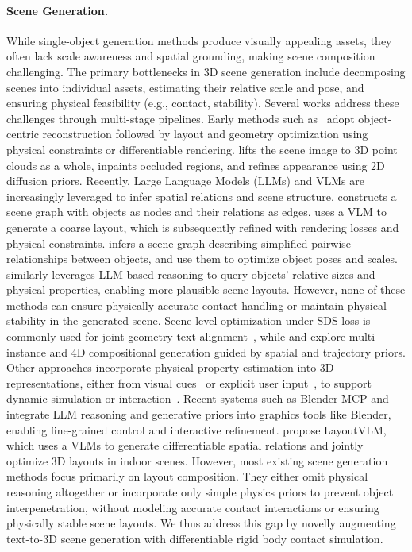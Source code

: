 \paragraph{Scene Generation.} 
While single-object generation methods produce visually appealing assets, they often lack scale awareness and spatial grounding, making scene composition challenging.
The primary bottlenecks in 3D scene generation include decomposing scenes into individual assets, estimating their relative scale and pose, and ensuring physical feasibility (e.g., contact, stability).
Several works address these challenges through multi-stage pipelines.
Early methods such as~\cite{vilesov2023cg3d,chen2024comboverse,han2024reparo} adopt object-centric reconstruction followed by layout and geometry optimization using physical constraints or differentiable rendering.
\citet{shriram2024realmdreamer} lifts the scene image to 3D point clouds as a whole, inpaints occluded regions, and refines appearance using 2D diffusion priors.
Recently, Large Language Models (LLMs) and VLMs are increasingly leveraged to infer spatial relations and scene structure.
\citet{gao2024graphdreamer} constructs a scene graph with objects as nodes and their relations as edges.
\citet{zhou2024gala3d} uses a VLM to generate a coarse layout, which is subsequently refined with rendering losses and physical constraints.
\citet{yao2025cast} infers a scene graph describing simplified pairwise relationships between objects, and use them to optimize object poses and scales.
\citet{wang2025embodiedgengenerative3dworld} similarly leverages LLM-based reasoning to query objects’ relative sizes and physical properties, enabling more plausible scene layouts. However, none of these methods can ensure physically accurate contact handling or maintain physical stability in the generated scene.
Scene-level optimization under SDS loss is commonly used for joint geometry-text alignment~\cite{zhou2025layoutdreamer}, while \citet{huang2024midi} and \citet{xu2024comp4d} explore multi-instance and 4D compositional generation guided by spatial and trajectory priors.
Other approaches incorporate physical property estimation into 3D representations, either from visual cues~\cite{zhao2024automated} or explicit user input~\cite{chen2025physgen3d}, to support dynamic simulation or interaction~\cite{liu2024physgen}.
Recent systems such as Blender-MCP and \citet{li2025phip} integrate LLM reasoning and generative priors into graphics tools like Blender, enabling fine-grained control and interactive refinement. \citet{sun2024layoutvlm} propose LayoutVLM, which uses a VLMs to generate differentiable spatial relations and jointly optimize 3D layouts in indoor scenes. However, most existing scene generation methods focus primarily on layout composition. They either omit physical reasoning altogether or incorporate only simple physics priors to prevent object interpenetration, without modeling accurate contact interactions or ensuring physically stable scene layouts.
We thus address this gap by novelly augmenting text-to-3D scene generation with differentiable rigid body contact simulation.

